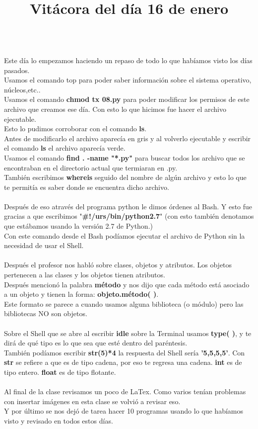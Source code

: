 \documentclass{article}
\begin{document}
	\title{\huge\textbf{Vitácora del día 16 de enero\\}} \\
	Este día lo empezamos haciendo un repaso de todo lo que habíamos visto los días pasados. \\
	Usamos el comando top para poder saber información sobre el sistema operativo, núcleos,etc..\\
	Usamos el comando \textbf{chmod tx 08.py} para poder modificar los permisos de este archivo que creamos ese día. Con esto lo que hicimos fue hacer el archivo ejecutable. \\
	Esto lo pudimos corroborar con el comando \textbf{ls}. \\
	Antes de modificarlo el archivo aparecía en gris y al volverlo ejecutable y escribir el comando \textbf{ls} el archivo aparecía verde. \\
	Usamos el comando \textbf{find . -name "*.py"} para buscar todos los archivo que se encontraban en el directorio actual que termiaran en .py.\\ 
	También escribimos \textbf{whereis } seguido del nombre de algún archivo y esto lo que te permitía es saber donde se encuentra dicho archivo.\\ \\
	Después de eso através del programa python le dimos órdenes al Bash. Y esto fue gracias a que escribimos "\textbf{\#!/urs/bin/python2.7}" (con esto también denotamos que estábamos usando la versión 2.7 de Python.) \\
	Con este comando desde el Bash podíamos ejecutar el archivo de Python sin la necesidad de usar el Shell.\\ \\ 
	Después el profesor nos habló sobre clases, objetos y atributos. Los objetos pertenecen a las clases y los objetos tienen atributos.\\
	Después mencionó la palabra \textbf{método} y nos dijo que cada método está asociado a un objeto y tienen la forma: \textbf{objeto.método( )}. \\
	Este formato se parece a cuando usamos alguna biblioteca (o módulo) pero las bibliotecas NO son objetos.\\ \\
	Sobre el Shell que se abre al escribir \textbf{idle} sobre la Terminal usamos \textbf{type( )}, y te dirá de qué tipo es lo que sea que esté dentro del paréntesis. \\
	También podíamos escribir \textbf{str(5)*4} la respuesta del Shell sería \textbf{'5,5,5,5'}. Con \textbf{str} se refiere a que es de tipo cadena, por eso te regresa una cadena. \textbf{int} es de tipo entero. \textbf{float} es de tipo flotante.\\ \\ 
	Al final de la clase revisamos un poco de LaTex. Como varios tenían problemas con insertar imágenes en esta clase se volvió a revisar eso. \\
	Y por último se nos dejó de tarea hacer 10 programas usando lo que habíamos visto y revisado en todos estos días.
	
\end{document}
